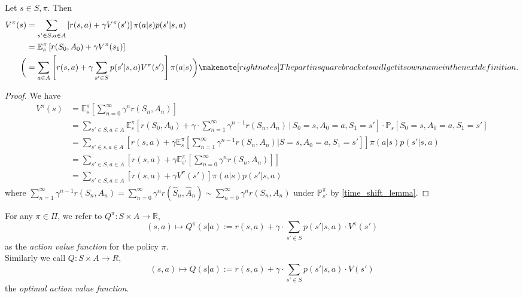 \begin{theorem}
    Let \( s \in S, \pi   \). Then 
    \begin{align*}
                V^\pi(s) &= \sum_{s' \in S, a \in A} \left[ r(s,a) + \gamma V^\pi(s')  \right] \pi(a | s) p(s' | s,a)\\
                 &= \mathbb{E}_s^\pi \left[ r(S_{0},A_{0}) + \gamma V^\pi(s_{1}) \right] \\
                 \bigg(&= \sum_{a \in A} \left[ r(s,a) + \gamma \sum_{s' \in S} p(s' | s,a) V^\pi(s')\right] \pi(a | s)\bigg) \note{The part in square brackets will get its own name in the next definition.}
    \end{align*}
\end{theorem}
\begin{proof}
    We have 
    \begin{align*}
        V^\pi(s) &= \mathbb{E}_s^\pi \left[  \sum_{n=0}^{\infty}\gamma^n r(S_n, A_n) \right] \\
        &= \sum_{s' \in S, a\in A} \mathbb{E}_s^\pi \left[ r(S_{0},A_{0}) + \gamma\cdot \sum_{n=1}^\infty \gamma^{n-1} r(S_n, A_n)    \,|\, S_{0} = s, A_{0} = a, S_{1} = s' \right] \cdot \mathbb{P}_s \left[ S_{0} = s, A_{0} = a, S_{1} = s' \right]\\
        &= \sum_{s' \in s, a \in A} \left[ r(s,a) + \gamma \mathbb{E}_s^\pi \left[ \sum_{n=1}^\infty \gamma^{n-1} r(S_n, A_n) | S = s, A_{0} = a, S_{1} = s' \right] \right] \pi(a|s) p(s'| s,a) \\
        &= \sum_{s' \in S, a \in A }\left[ r(s,a) + \gamma \mathbb{E}_{s'}^\pi \left[ \sum_{n=0}^{\infty} \gamma^n r(S_n, A_n) \right] \right] \\
        &= \sum_{s' \in S, a \in A} \left[ r(s,a) + \gamma V^\pi(s') \right] \pi(a| s) p(s' | s,a)
    \end{align*}
    where \( \sum_{n=1}^{\infty} \gamma^{n-1} r(S_n, A_n)  = \sum_{n=0}^{\infty} \gamma^n r(\hat{S}_n, \hat{A}_n) \sim \sum_{n=0}^{\infty} \gamma^n r(S_n, A_n)\) under \( \mathbb{P}_{s'}^\pi \) by \cref{time_shift_lemma}.  
\end{proof}


\begin{definition}[\( Q^\pi \) \qquad \( Q \) ]
    For any \( \pi \in \Pi \), we refer to \( Q^\pi: S \times A \to \mathbb{R} \),
    \[
        (s,a) \mapsto Q^\pi(s|a) := r(s,a) + \gamma \cdot \sum_{s' \in S} p(s' | s,a) \cdot V^\pi(s')
    \]  
    as the \emph{action value function} for the policy \( \pi \). \\
    
    Similarly we call \( Q: S \times A \to R \), 
    \[  
        (s,a) \mapsto Q(s|a) := r(s,a) + \gamma \cdot \sum_{s' \in S} p(s' | s,a) \cdot V(s')
    \]
    the \emph{optimal action value function}.
\end{definition}

